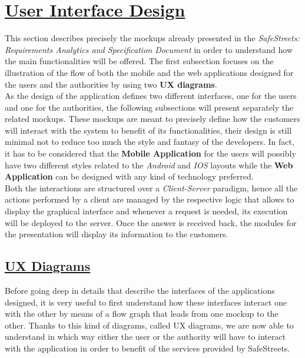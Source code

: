 \section[User Interface Design]{\hyperlink{toc}{User Interface Design}}
	\label{sec:userInterfaceDesign}
	
	This section describes precisely the mockups already presented in the \emph{SafeStreets: Requirements Analytics and Specification Document} \cite{RASD} in order to understand how the main functionalities will be offered. The first subsection focuses on the illustration of the flow of both the mobile and the web applications designed for the users and the authorities by using two \textbf{UX diagrams}.\\
	
	As the design of the application defines two different interfaces, one for the users and one for the authorities, the following subsections will present separately the related mockups. These mockups are meant to precisely define how the customers will interact with the system to benefit of its functionalities, their design is still minimal not to reduce too much the style and fantasy of the developers. In fact, it has to be considered that the \textbf{Mobile Application} for the users will possibly have two different styles related to the \emph{Android} and \emph{IOS} layouts while the \textbf{Web Application} can be designed with any kind of technology preferred.\\
	
	Both the interactions are structured over a \emph{Client-Server} paradigm, hence all the actions performed by a client are managed by the respective logic that allows to display the graphical interface and whenever a request is needed, its execution will be deployed to the server. Once the answer is received back, the modules for the presentation will display its information to the customers.
	
	\subsection[UX Diagrams]{\hyperlink{toc}{UX Diagrams}}
		\label{sec:uxDiagrams}
		
		Before going deep in details that describe the interfaces of the applications designed, it is very useful to first understand how these interfaces interact one with the other by means of a flow graph that leads from one mockup to the other. Thanks to this kind of diagrams, called UX diagrams, we are now able to understand in which way either the user or the authority will have to interact with the application in order to benefit of the services provided by SafeStreets.\\
		
